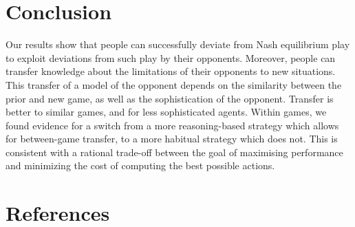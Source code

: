 \documentclass[
  english,
  man,floatsintext]{apa6}
\begin{document}
\hypertarget{conclusion}{%
\section{Conclusion}\label{conclusion}}

Our results show that people can successfully deviate from Nash equilibrium play to exploit deviations from such play by their opponents. Moreover, people can transfer knowledge about the limitations of their opponents to new situations. This transfer of a model of the opponent depends on the similarity between the prior and new game, as well as the sophistication of the opponent. Transfer is better to similar games, and for less sophisticated agents. Within games, we found evidence for a switch from a more reasoning-based strategy which allows for between-game transfer, to a more habitual strategy which does not. This is consistent with a rational trade-off between the goal of maximising performance and minimizing the cost of computing the best possible actions.

\hypertarget{references}{%
\section{References}\label{references}}
\end{document}

